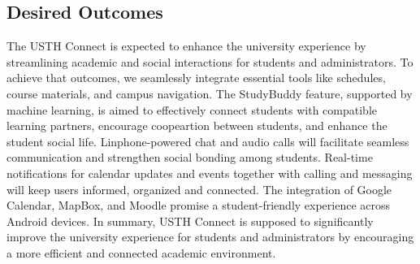 \documentclass{article}
\begin{document}
\subsection{Desired Outcomes}  
The USTH Connect is expected to enhance the university experience by streamlining academic and social interactions for students and administrators.
To achieve that outcomes, we seamlessly integrate essential tools like schedules, course materials, and campus navigation.
The StudyBuddy feature, supported by machine learning, is aimed to effectively connect students with compatible learning partners, encourage coopeartion between students, and enhance the student social life.
Linphone-powered chat and audio calls will facilitate seamless communication and strengthen social bonding among students.
Real-time notifications for calendar updates and events together with calling and messaging will keep users informed, organized and connected.
The integration of Google Calendar, MapBox, and Moodle promise a student-friendly experience across Android devices.
In summary, USTH Connect is supposed to significantly improve the university experience for students and administrators by encouraging a more efficient and connected academic environment.

\pagebreak
\end{document}
